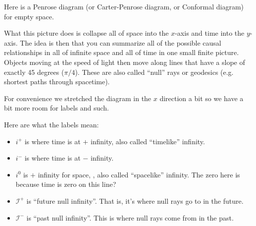 \documentclass[12pt,border=3pt,tikz]{article}
\def\scri{\mathscr I}
\def\ip{i^+}
\def\im{i^-}
\def\iz{i^0}
\begin{document}
Here is a Penrose diagram (or Carter-Penrose diagram, or Conformal diagram) for empty space.

\begin{center}
\end{center}

What this picture does is collapse all of space into the $x$-axis and time into the $y$-axis.
The idea is then that you can summarize all of the possible causal relationships in
all of infinite space and all of time in one small finite picture. Objects moving at the speed
of light then move along lines that have a slope of exactly 45 degrees
($\pi/4$). These are also called ``null'' rays or geodesics (e.g. shortest paths through spacetime).

For convenience we stretched the diagram in the $x$ direction a bit so we have a bit more room for labels
and such. 


Here are what the labels mean:

\begin{itemize}
\item $i^+$ is where time is at $+$ infinity, also called ``timelike'' infinity.
\item $i^-$ is where time is at $-$ infinity.
\item $i^0$ is $+$ infinity for space, , also called ``spacelike'' infinity. The zero here is because
time is zero on this line?
\item $\scri^+$ is ``future null infinity''. That is, it's where null rays go to in the future.
\item $\scri^-$ is ``past null infinity''. This is where null rays come from in the past.
\end{itemize}
\end{document}
